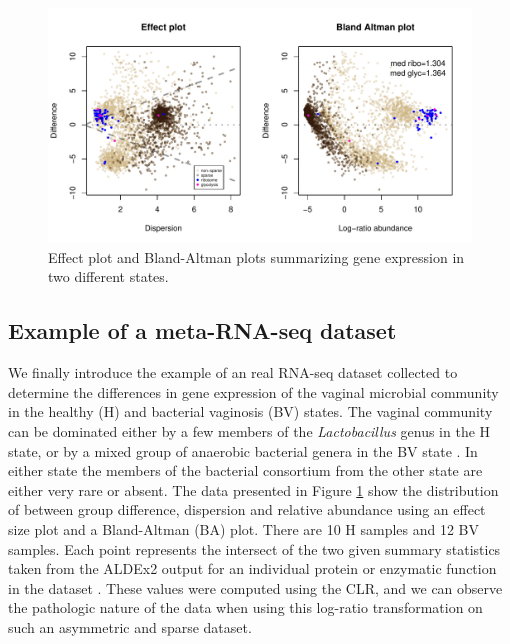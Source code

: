 \documentclass[10pt]{article}
\begin{document}
\begin{figure}[ht]
\includegraphics[width=5in]{../figures/twtyfr.pdf}
\caption{Effect plot and Bland-Altman plots summarizing gene expression in two different states. }
\label{Fig:bv}
\end{figure}


\subsection{Example of a meta-RNA-seq dataset}
\vskip-0.25cm We finally introduce the example of an real RNA-seq dataset collected to determine the differences in gene expression of the vaginal microbial community in the healthy (H) and bacterial vaginosis (BV) states. The vaginal community can be dominated either by a few members of the \textit{Lactobacillus} genus in the H state, or by a mixed group of anaerobic bacterial genera in the BV state . In either state the members of the bacterial consortium from the other state are either very rare or absent. The data presented in Figure \ref{Fig:bv} show the distribution of between group difference, dispersion and relative abundance using an effect size plot  and a Bland-Altman (BA) plot. There are 10 H samples and 12 BV samples. Each point represents the intersect of the two given summary statistics taken from the ALDEx2 output for an individual protein or enzymatic function in the dataset . These values were computed using the CLR, and we can observe the pathologic nature of the data when using this log-ratio transformation on such an asymmetric and sparse dataset. 
\end{document}

